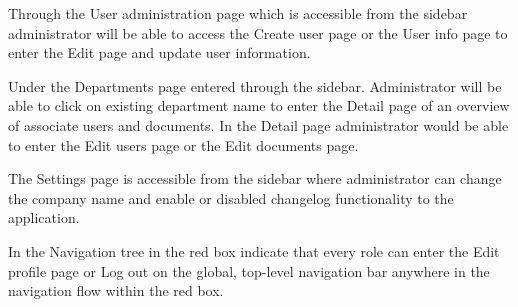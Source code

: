 Through the User administration page which is accessible from the sidebar administrator will be able to access the Create user page or the User info page to enter the Edit page and update user information.

Under the Departments page entered through the sidebar.
Administrator will be able to click on existing department name to enter the Detail page of an overview of associate users and documents.
In the Detail page administrator would be able to enter the Edit users page or the Edit documents page.

The Settings page is accessible from the sidebar where administrator can change the company name and enable or disabled changelog functionality to the application.

In the Navigation tree in  the red box indicate that every role can enter the Edit profile page or Log out on the global, top-level navigation bar anywhere in the navigation flow within the red box.
